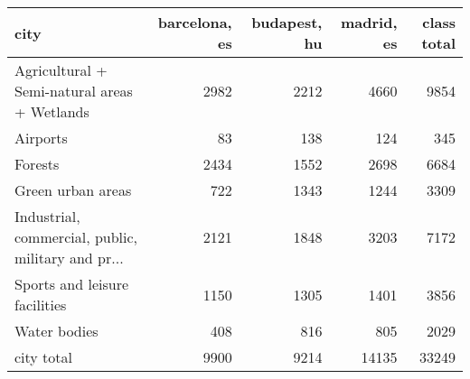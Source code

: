 \begin{tabular}{lrrrr}
\toprule
city &  barcelona, es &  budapest, hu &  madrid, es &  class total \\
\midrule
Agricultural + Semi-natural areas + Wetlands       &           2982 &          2212 &        4660 &         9854 \\
Airports                                           &             83 &           138 &         124 &          345 \\
Forests                                            &           2434 &          1552 &        2698 &         6684 \\
Green urban areas                                  &            722 &          1343 &        1244 &         3309 \\
Industrial, commercial, public, military and pr... &           2121 &          1848 &        3203 &         7172 \\
Sports and leisure facilities                      &           1150 &          1305 &        1401 &         3856 \\
Water bodies                                       &            408 &           816 &         805 &         2029 \\
city total                                         &           9900 &          9214 &       14135 &        33249 \\
\bottomrule
\end{tabular}
